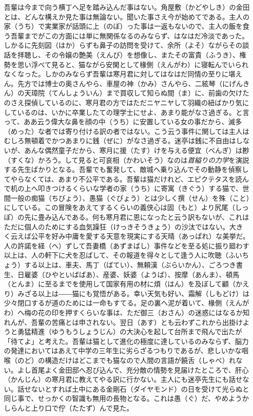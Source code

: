 \documentclass{book}
\begin{document}
吾輩は今まで向う横丁へ足を踏み込んだ事はない。角屋敷（かどやしき）の金田とは、どんな構えか見た事は無論ない。聞いた事さえ今が始めてである。主人の家（うち）で実業家が話頭に上（のぼ）った事は一返もないので、主人の飯を食う吾輩までがこの方面には単に無関係なるのみならず、はなはだ冷淡であった。しかるに先刻図（はか）らずも鼻子の訪問を受けて、余所（よそ）ながらその談話を拝聴し、その令嬢の艶美（えんび）を想像し、またその富貴（ふうき）、権勢を思い浮べて見ると、猫ながら安閑として椽側（えんがわ）に寝転んでいられなくなった。しかのみならず吾輩は寒月君に対してはなはだ同情の至りに堪えん。先方では博士の奥さんやら、車屋の神（かみ）さんやら、二絃琴（にげんきん）の天璋院（てんしょういん）まで買収して知らぬ間（ま）に、前歯の欠けたのさえ探偵しているのに、寒月君の方ではただニヤニヤして羽織の紐ばかり気にしているのは、いかに卒業したての理学士にせよ、あまり能がなさ過ぎる。と言って、ああ云う偉大な鼻を顔の中（うち）に安置している女の事だから、滅多（めった）な者では寄り付ける訳の者ではない。こう云う事件に関しては主人はむしろ無頓着でかつあまりに銭（ぜに）がなさ過ぎる。迷亭は銭に不自由はしないが、あんな偶然童子だから、寒月に援（たす）けを与える便宜（べんぎ）は尠（すくな）かろう。して見ると可哀相（かわいそう）なのは\emph{首縊りの力学}を演説する先生ばかりとなる。吾輩でも奮発して、敵城へ乗り込んでその動静を偵察してやらなくては、あまり不公平である。吾輩は猫だけれど、エピクテタスを読んで机の上へ叩きつけるくらいな学者の家（うち）に寄寓（きぐう）する猫で、世間一般の痴猫（ちびょう）、愚猫（ぐびょう）とは少しく撰（せん）を殊（こと）にしている。この冒険をあえてするくらいの義侠心は固（もと）より尻尾（しっぽ）の先に畳み込んである。何も寒月君に恩になったと云う訳もないが、これはただに個人のためにする血気躁狂（けっきそうきょう）の沙汰ではない。大きく云えば公平を好み中庸を愛する天意を現実にする天晴（あっぱれ）な美挙だ。人の許諾を経（へ）ずして吾妻橋（あずまばし）事件などを至る処に振り廻わす以上は、人の軒下に犬を忍ばして、その報道を得々として逢う人に吹聴（ふいちょう）する以上は、車夫、馬丁（ばてい）、無頼漢（ぶらいかん）、ごろつき書生、日雇婆（ひやといばばあ）、産婆、妖婆（ようば）、按摩（あんま）、頓馬（とんま）に至るまでを使用して国家有用の材に煩（はん）を及ぼして顧（かえり）みざる以上は――猫にも覚悟がある。幸い天気も好い、霜解（しもどけ）は少々閉口するが道のためには一命もすてる。足の裏へ泥が着いて、椽側（えんがわ）へ梅の花の印を押すくらいな事は、ただ御三（おさん）の迷惑にはなるか知れんが、吾輩の苦痛とは申されない。翌日（あす）とも云わずこれから出掛けようと勇猛精進（ゆうもうしょうじん）の大決心を起して台所まで飛んで出たが「待てよ」と考えた。吾輩は猫として進化の極度に達しているのみならず、脳力の発達においてはあえて中学の三年生に劣らざるつもりであるが、悲しいかな咽喉（のど）の構造だけはどこまでも猫なので人間の言語が饒舌（しゃべ）れない。よし首尾よく金田邸へ忍び込んで、充分敵の情勢を見届けたところで、肝心（かんじん）の寒月君に教えてやる訳に行かない。主人にも迷亭先生にも話せない。話せないとすれば土中にある金剛石（ダイヤモンド）の日を受けて光らぬと同じ事で、せっかくの智識も無用の長物となる。これは愚（ぐ）だ、やめようかしらんと上り口で佇（たたず）んで見た。
\end{document}
